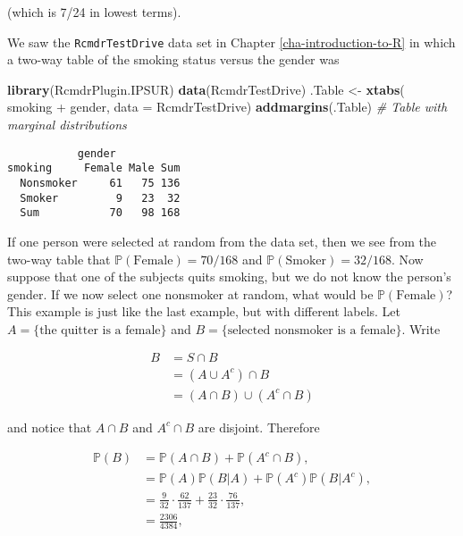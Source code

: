 \documentclass[]{book}
\newenvironment{Shaded}{\begin{snugshade}}{\end{snugshade}}
\newcommand{\KeywordTok}[1]{\textcolor[rgb]{0.13,0.29,0.53}{\textbf{{#1}}}}
\newcommand{\DataTypeTok}[1]{\textcolor[rgb]{0.13,0.29,0.53}{{#1}}}
\newcommand{\StringTok}[1]{\textcolor[rgb]{0.31,0.60,0.02}{{#1}}}
\newcommand{\CommentTok}[1]{\textcolor[rgb]{0.56,0.35,0.01}{\textit{{#1}}}}
\newcommand{\NormalTok}[1]{{#1}}
\numberwithin{equation}{chapter}
\numberwithin{figure}{chapter}
\theoremstyle{plain}
\theoremstyle{definition}
\theoremstyle{remark}
\theoremstyle{definition}
\theoremstyle{definition}
\theoremstyle{remark}
\let\BeginKnitrBlock\begin \let\EndKnitrBlock\end
\begin{document}
(which is 7/24 in lowest terms).

\bigskip

\BeginKnitrBlock{example}
\protect\hypertarget{ex:unnamed-chunk-167}{}{\label{ex:unnamed-chunk-167}}We
saw the \texttt{RcmdrTestDrive} data set in Chapter
\ref{cha-introduction-to-R} in which a two-way table of the smoking
status versus the gender was
\EndKnitrBlock{example}

\begin{Shaded}
\begin{Highlighting}[]
\KeywordTok{library}\NormalTok{(RcmdrPlugin.IPSUR)}
\KeywordTok{data}\NormalTok{(RcmdrTestDrive)  }
\NormalTok{.Table <-}\StringTok{ }\KeywordTok{xtabs}\NormalTok{( ~}\StringTok{ }\NormalTok{smoking +}\StringTok{ }\NormalTok{gender, }\DataTypeTok{data =} \NormalTok{RcmdrTestDrive)}
\KeywordTok{addmargins}\NormalTok{(.Table) }\CommentTok{# Table with marginal distributions}
\end{Highlighting}
\end{Shaded}

\begin{verbatim}
           gender
smoking     Female Male Sum
  Nonsmoker     61   75 136
  Smoker         9   23  32
  Sum           70   98 168
\end{verbatim}

If one person were selected at random from the data set, then we see
from the two-way table that \(\mathbb{P}(\mbox{Female})=70/168\) and
\(\mathbb{P}(\mbox{Smoker})=32/168\). Now suppose that one of the
subjects quits smoking, but we do not know the person's gender. If we
now select one nonsmoker at random, what would be
\(\mathbb{P}(\mbox{Female})\)? This example is just like the last
example, but with different labels. Let
\(A = \{ \mbox{the quitter is a female} \}\) and
\(B = \{ \mbox{selected nonsmoker is a female} \} \). Write

\begin{align*}
B & =S\cap B\\
 & =(A\cup A^{c})\cap B\\
 & =(A\cap B)\cup(A^{c}\cap B)
\end{align*}

and notice that \(A\cap B\) and \(A^{c}\cap B\) are disjoint. Therefore

\begin{align*}
\mathbb{P}(B) & =\mathbb{P}(A\cap B)+\mathbb{P}(A^{c}\cap B),\\
 & =\mathbb{P}(A)\mathbb{P}(B|A)+\mathbb{P}(A^{c})\mathbb{P}(B|A^{c}),\\
 & =\frac{9}{32}\cdot\frac{62}{137}+\frac{23}{32}\cdot\frac{76}{137},\\
 & =\frac{2306}{4384},
\end{align*}
\end{document}

